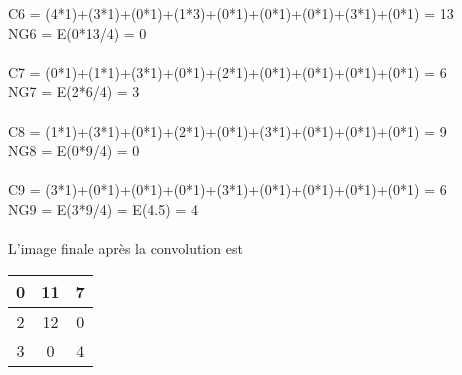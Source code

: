 \documentclass{article}
\begin{document}
 C6 = (4*1)+(3*1)+(0*1)+(1*3)+(0*1)+(0*1)+(0*1)+(3*1)+(0*1) = 13 \\
 NG6 = E(0*13/4) = 0 \\ \\ 
 C7 = (0*1)+(1*1)+(3*1)+(0*1)+(2*1)+(0*1)+(0*1)+(0*1)+(0*1) = 6 \\
 NG7 = E(2*6/4) = 3 \\ \\
 C8 = (1*1)+(3*1)+(0*1)+(2*1)+(0*1)+(3*1)+(0*1)+(0*1)+(0*1) = 9 \\
 NG8 = E(0*9/4) = 0 \\ \\
 C9 = (3*1)+(0*1)+(0*1)+(0*1)+(3*1)+(0*1)+(0*1)+(0*1)+(0*1) = 6 \\
 NG9 = E(3*9/4) = E(4.5) = 4 \\ \\
 
 L'image finale après la convolution est
 \begin{tabular}{|c|c|c|}
\hline
0 & 11 & 7 \\
\hline
2 & 12 & 0 \\
\hline
3 & 0 & 4 \\
\hline 
\end{tabular}
\end{document}
